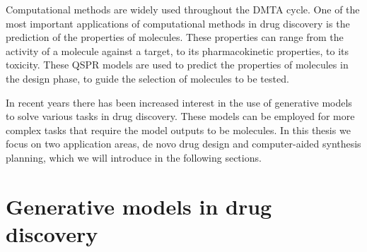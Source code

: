 Computational methods are widely used throughout the DMTA cycle.
One of the most important applications of computational methods in drug discovery is the prediction of
the properties of molecules. These properties can range from the activity of a molecule against a
target, to its pharmacokinetic properties, to its toxicity. These \ac{QSPR} models are used to
predict the properties of molecules in the design phase, to guide the selection of molecules to be
tested.

In recent years there has been increased interest in the use of generative models to solve various
tasks in drug discovery. These models can be employed for more complex tasks that require the
model outputs to be molecules. In this thesis we focus on two application areas, de novo drug design
and computer-aided synthesis planning, which we will introduce in the following sections.

\section{Generative models in drug discovery}
